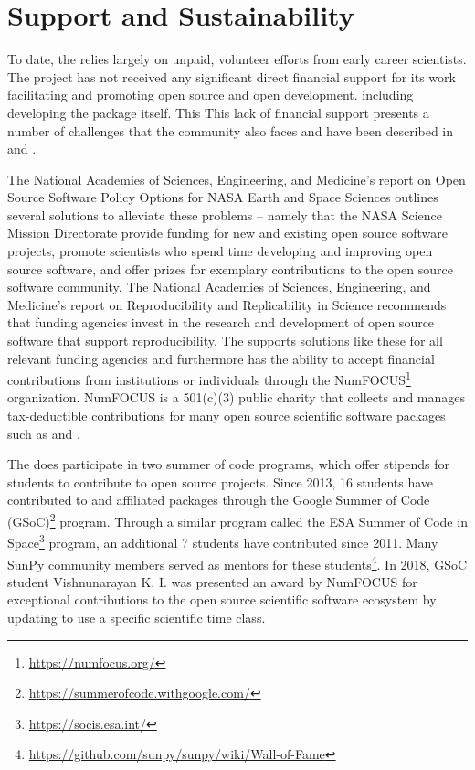 \section{Support and Sustainability}
\label{sec:support}

To date, the \sunpyproj relies largely on unpaid, volunteer efforts from early career scientists.
The project has not received any significant direct financial support for its work facilitating and promoting open source and open development. including developing the \sunpypkg package itself.
This This lack of financial support presents a number of challenges that the \astropy community also faces and have been described in \cite{PriceWhelan:2018ji} and \cite{Muna2016}.

The National Academies of Sciences, Engineering, and Medicine's report on Open Source Software Policy Options for NASA Earth and Space Sciences \citep{NAP2018} outlines several solutions to alleviate these problems -- namely that the NASA Science Mission Directorate provide funding for new and existing open source software projects, promote scientists who spend time developing and improving open source software, and offer prizes for exemplary contributions to the open source software community.
The National Academies of Sciences, Engineering, and Medicine's report on Reproducibility and Replicability in Science \citep{NAP2019} recommends that funding agencies invest in the research and development of open source software that support reproducibility.
The \sunpyproj supports solutions like these for all relevant funding agencies and furthermore has the ability to accept financial contributions from institutions or individuals through the NumFOCUS\footnote{\url{https://numfocus.org/}} organization. NumFOCUS is a 501(c)(3) public charity that collects and manages tax-deductible contributions for many open source scientific software packages such as \numpy and \astropy.

The \sunpyproj does participate in two summer of code programs, which offer stipends for students to contribute to open source projects.
Since 2013, 16 students have contributed to \sunpypkg and affiliated packages through the Google Summer of Code (GSoC)\footnote{\url{https://summerofcode.withgoogle.com/}} program.
Through a similar program called the ESA Summer of Code in Space\footnote{\url{https://socis.esa.int/}} program, an additional 7 students have contributed since 2011.
Many SunPy community members served as mentors for these students\footnote{\url{https://github.com/sunpy/sunpy/wiki/Wall-of-Fame}}.
In 2018, GSoC student Vishnunarayan K. I. was presented an award by NumFOCUS for exceptional contributions to the open source scientific software ecosystem by updating \sunpypkg to use a specific scientific time class.
